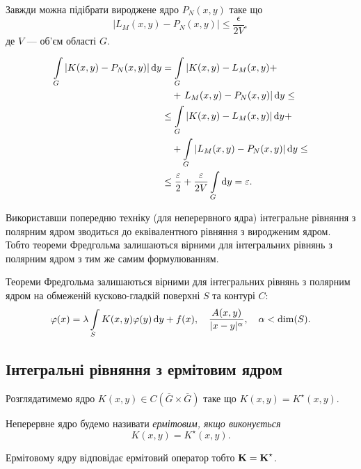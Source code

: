 Завжди можна підібрати вироджене ядро $P_N(x, y)$ таке що 
\begin{equation}
	|L_M(x, y) - P_N(x, y)| \le \dfrac{\epsilon}{2V},
\end{equation}
де $V$ --- об'єм області $G$. 

\begin{equation}
	\begin{aligned}
		\Int_G |K(x, y) - P_N(x, y)| \diff y &= \Int_G \left| K(x, y) - L_M(x, y) + \right. \\
		&\quad + \left. L_M(x, y) - P_N(x, y) \right| \diff y \le \\
		&\le \Int_G | K(x, y) - L_M(x, y)| \diff y + \\
		&\quad + \Int_G |L_M(x, y) - P_N(x, y)| \diff y \le \\
		&\le \dfrac{\epsilon}{2} + \dfrac{\epsilon}{2V} \Int_G \diff y = \epsilon.
	\end{aligned}
\end{equation}

Використавши попередню техніку (для неперервного ядра) інтегральне рівняння з полярним ядром зводиться до еквівалентного рівняння з виродженим ядром. Тобто теореми Фредгольма залишаються вірними для інтегральних рівнянь з полярним ядром з тим же самим формулюванням. \medskip

Теореми Фредгольма залишаються вірними для інтегральних рівнянь з полярним ядром на обмеженій кусково-гладкій поверхні $S$ та контурі $C$:
\begin{equation}
	\phi(x) = \lambda \Int_S K(x, y) \phi(y) \diff y + f(x), \quad \dfrac{A(x, y)}{|x - y|^\alpha}, \quad \alpha < \dim(S).
\end{equation}

\subsection{Інтегральні рівняння з ермітовим ядром}

Розглядатимемо ядро $K(x, y) \in C\left(\overline G \times \overline G\right)$ таке що $K(x, y) = K^\star (x, y)$.

\begin{definition}
	Неперервне ядро будемо називати \it{ермітовим}, якщо виконується
	\begin{equation}
		K(x, y) = K^\star (x, y).
	\end{equation}
\end{definition}

\begin{remark}
	Ермітовому ядру відповідає ермітовий оператор тобто $\bf{K} = \bf{K}^\star $.
\end{remark}

